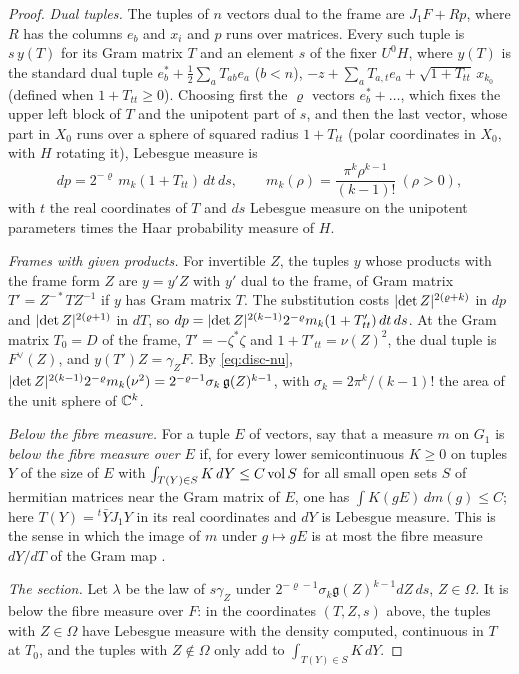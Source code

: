 \begin{proof}
\emph{Dual tuples.} The tuples of $n$ vectors dual to the frame are $J_1F+Rp$, where $R$ has the columns $e_b$ and $x_i$ and $p$ runs over matrices. Every such tuple is $s\,y(T)$ for its Gram matrix $T$ and an element $s$ of the
fixer $U^0H$, where $y(T)$ is the standard dual tuple $e^*_b+\frac12\sum_aT_{ab}e_a$ ($b<n$), $-z+\sum_aT_{a,t}e_a+\sqrt{1+T_{tt}}\,x_{k_0}$ (defined when $1+T_{tt}\ge0$). Choosing first the $\varrho$ vectors $e^*_b+\dots$, which fixes the upper left block of $T$
and the unipotent part of $s$, and then the last vector, whose part in $X_0$ runs over a sphere of squared radius $1+T_{tt}$ (polar coordinates in $X_0$, with $H$ rotating it), Lebesgue measure is
\[
  dp=2^{-\varrho}\,m_k(1+T_{tt})\,dt\,ds,\qquad m_k(\rho)=\frac{\pi^k\rho^{k-1}}{(k-1)!}\ (\rho>0),
\]
with $t$ the real coordinates of $T$ and $ds$ Lebesgue measure on the unipotent parameters times the Haar probability measure of $H$.

\emph{Frames with given products.} For invertible $Z$, the tuples $y$ whose products with the frame form $Z$ are $y=y'Z$ with $y'$ dual to the frame, of Gram matrix $T'=Z^{-*}TZ^{-1}$ if $y$ has Gram matrix $T$. The substitution
costs $\lvert \det Z\rvert^{2(\varrho+k)}$ in $dp$ and $\lvert \det Z\rvert^{2(\varrho+1)}$ in $dT$, so $dp=\lvert \det Z\rvert^{2(k-1)}2^{-\varrho}m_k(1+T'_{tt})\,dt\,ds$. At the Gram matrix $T_0=D$ of the frame, $T'=-\zeta^*\zeta$ and $1+T'_{tt}=\nu(Z)^2$, the dual tuple is
$F^\vee(Z)$, and $y(T')Z=\gamma_ZF$. By \eqref{eq:disc-nu}, $\lvert \det Z\rvert^{2(k-1)}2^{-\varrho}m_k(\nu^2)=2^{-\varrho-1}\sigma_k\,\mathfrak g(Z)^{k-1}$, with $\sigma_k=2\pi^k/(k-1)!$ the area of the unit sphere of $\mathbb{C}^k$.

\emph{Below the fibre measure.} For a tuple $E$ of vectors, say that a measure $m$ on $G_1$ is \emph{below the fibre measure over $E$} if, for every lower semicontinuous $K\ge0$ on tuples $Y$ of the size of $E$ with
$\int_{T(Y)\in S}K\,dY\le C\operatorname{vol} S$ for all small open sets $S$ of hermitian matrices near the Gram matrix of $E$, one has $\int K(gE)\,dm(g)\le C$; here $T(Y)={}^t\bar YJ_1Y$ in its real coordinates and $dY$ is Lebesgue measure. This
is the sense in which the image of $m$ under $g\mapsto gE$ is at most the fibre measure $dY/dT$ of the Gram map \cite{Siegel1935}.

\emph{The section.} Let $\lambda$ be the law of $s\gamma_Z$ under $2^{-\varrho-1}\sigma_k\mathfrak g(Z)^{k-1}dZ\,ds$, $Z\in\Omega$. It is below the fibre measure over $F$: in the coordinates $(T,Z,s)$ above, the tuples with $Z\in\Omega$ have Lebesgue
measure with the density computed, continuous in $T$ at $T_0$, and the tuples with $Z\notin\Omega$ only add to $\int_{T(Y)\in S}K\,dY$.


\end{proof}
